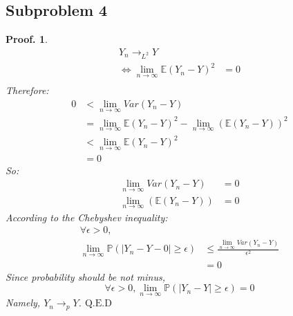\documentclass{article}
\theoremstyle{break}
\newtheorem*{proof_break}{Proof.}
\begin{document}
    \subsection{Subproblem 4}
    \begin{proof_break}
        \begin{align*}
            Y_n\to_{L^2}Y\\
            \Leftrightarrow\lim_{n\to\infty}\mathbb{E}(Y_n-Y)^2&=0\\
        \end{align*}
        Therefore:
        \begin{align*} 
            0&<\lim_{n\to\infty}Var(Y_n-Y)\\
            &=\lim_{n\to\infty}\mathbb{E}(Y_n-Y)^2-\lim_{n\to\infty}(\mathbb{E}(Y_n-Y))^2\\
            &<\lim_{n\to\infty}\mathbb{E}(Y_n-Y)^2\\
            &=0
        \end{align*}
        So:
        \begin{align*}
            \lim_{n\to\infty}Var(Y_n-Y)&=0\\
            \lim_{n\to\infty}(\mathbb{E}(Y_n-Y))&=0
        \end{align*}
        According to the Chebyshev inequality:
        \begin{align*}
            \forall \epsilon > 0,&\\
            \lim_{n\to\infty}\mathbb{P}(|Y_n-Y-0|\geq\epsilon)&\leq\frac{\lim_{n\to\infty}Var(Y_n-Y)}{\epsilon^2}\\
            &=0
        \end{align*}
        Since probability should be not minus,
        $$\forall \epsilon > 0,
        \lim_{n\to\infty}\mathbb{P}(|Y_n-Y|\geq\epsilon)=0$$
        Namely, $Y_n\to_{p}Y$.
        \newline$\mathrm{Q.E.D}$
    \end{proof_break}
\end{document}

